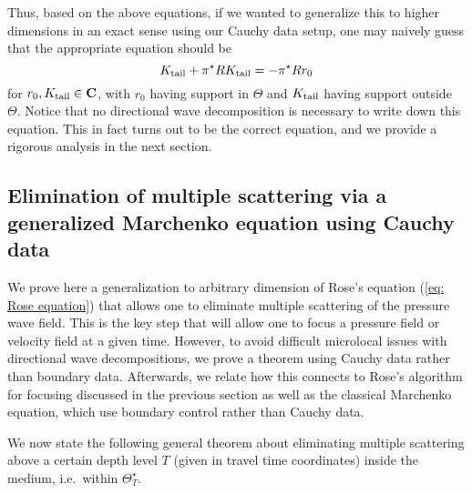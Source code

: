 \documentclass[10pt]{article}
\theoremstyle{plain}
\theoremstyle{definition}
\theoremstyle{remark}
\numberwithin{theorem}{section}
\numberwithin{example}{section}
\numberwithin{equation}{section}
\numberwithin{figure}{section}
\newcommand\tail{_{\textup{tail}}}
\begin{document}
Thus, based on the above equations, if we wanted to generalize this to higher dimensions in an exact sense using our Cauchy data setup, one may naively guess that the appropriate equation should be
\[ K\tail + \pi^{\star}R K\tail = -\pi^{\star}Rr_0\]
for $r_0, K\tail \in \mathbf{C}$, with $r_0$ having support in $\Theta$ and $K\tail$ having support outside $\Theta.$ Notice that no directional wave decomposition is necessary to write down this equation. This in fact turns out to be the correct equation, and we provide a rigorous analysis in the next section.

\subsection{Elimination of multiple scattering via a generalized Marchenko equation using Cauchy data}

We prove here a generalization to arbitrary dimension of Rose's equation (\ref{eq: Rose equation}) that allows one to eliminate multiple scattering of the pressure wave field. This is the key step that will allow one to focus a pressure field or velocity field at a given time. However, to avoid difficult microlocal issues with directional wave decompositions, we prove a theorem using Cauchy data rather than boundary data. Afterwards, we relate how this connects to Rose's algorithm for focusing discussed in the previous section as well as the classical Marchenko equation, which use boundary control rather than Cauchy data.

We now state the following general theorem about eliminating multiple scattering above a certain depth level $T$ (given in travel time coordinates) inside the medium, i.e.~within $\Theta^\star_T$.
\end{document}
